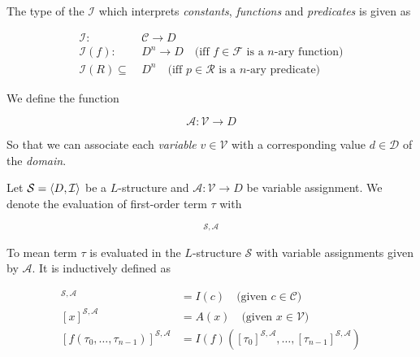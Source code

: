\begin{definition}[Interpretation]
    The type of the  $\mathcal{I}$ which interprets
    \textit{constants}, \textit{functions} and \textit{predicates} is given as
    
    \begin{align}
        \mathcal{I} \colon 
            &\ \mathcal{C} \to D \\
        \mathcal{I}(f) \colon 
            &\ D^n \to D
                \quad\text{(iff $f \in \mathcal{F}$ is a $n$-ary function)} \\
        \mathcal{I}(R) \subseteq 
            &\ D^n \quad\text{(iff $p \in \mathcal{R}$ is a $n$-ary predicate)}    
    \end{align}
\end{definition}

\begin{definition}
    We define the  function
    
    \begin{equation}
        \mathcal{A} \colon \mathcal{V} \to D
    \end{equation}
    
    So that we can associate each \textit{variable} $v \in \mathcal{V}$ with 
    a corresponding value $d \in \mathcal{D}$ of the \textit{domain}.
\end{definition}

\begin{definition}
    Let $\mathcal{S} = \langle {D, \mathcal{I}} \rangle$ be a $L$-structure and 
    $\mathcal{A} \colon \mathcal{V} \to D$ be variable assignment. We denote the
    evaluation of first-order term $\tau$ with
    
    \begin{equation}
        [\tau]^{\mathcal{S}, \mathcal{A}}
    \end{equation}
    
    To mean term $\tau$ is evaluated in the $L$-structure $\mathcal{S}$ with 
    variable assignments given by $\mathcal{A}$. It is inductively defined as
    
    \begin{align}
        [c]^{\mathcal{S}, \mathcal{A}} 
            &= I(c) \quad\text{(given $c \in \mathcal{C}$)} \\
        [x]^{\mathcal{S}, \mathcal{A}} 
            &= A(x) \quad\text{(given $x \in \mathcal{V}$)} \\
        [f(\tau_0, \ldots, \tau_{n-1})]^{\mathcal{S}, \mathcal{A}} 
            &= I(f)([\tau_0]^{\mathcal{S}, \mathcal{A}}, \ldots, 
                [\tau_{n-1}]^{\mathcal{S}, \mathcal{A}})
    \end{align}
\end{definition}

